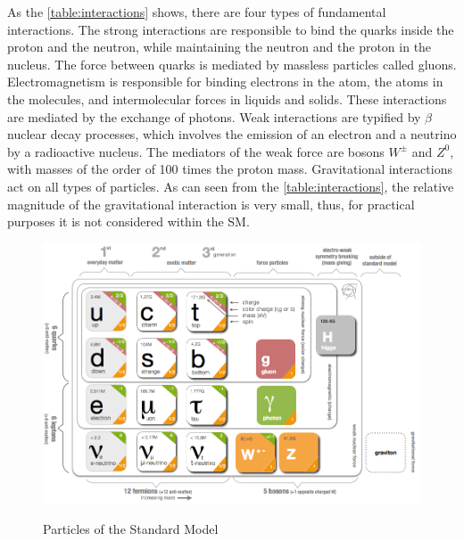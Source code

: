 \begin{table}[h]
{}
\caption{Fundamental Interactions \label{table:interactions} }
\end{table}

As the \cref{table:interactions} shows, there are four types of fundamental interactions.
The strong interactions are responsible to bind the quarks inside the proton and the neutron, while maintaining the neutron and the proton in the nucleus. The force between quarks is mediated by massless particles called gluons.
Electromagnetism is responsible for binding electrons in the atom, the atoms in the molecules, and intermolecular forces in liquids and solids. These interactions are mediated by the exchange of photons.
Weak interactions are typified by $\beta$ nuclear decay processes, which involves the emission of an electron and a neutrino by a radioactive nucleus.
The mediators of the weak force are bosons $W^{\pm}$ and $Z^{0}$, with masses of the order of
100 times the proton mass. Gravitational interactions act on all types of particles. 
As can seen from the \cref{table:interactions}, the relative magnitude of the gravitational interaction is very small, thus, for practical purposes it is not considered within the SM.

\begin{figure}[h]
  \centering
\includegraphics[width=12cm]{SM_chapter_plots/SM}
\label{SMfigure}\caption{Particles of the Standard Model}
\end{figure}

